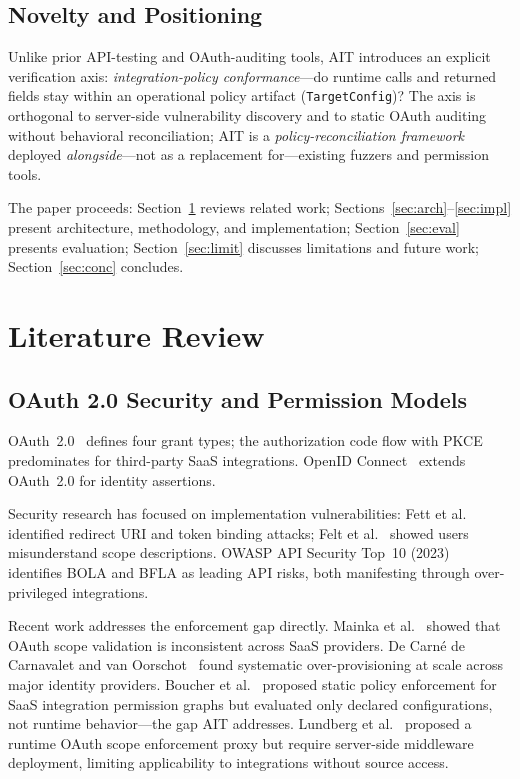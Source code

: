 \documentclass[conference]{IEEEtran}
\begin{document}
\subsection{Novelty and Positioning}

Unlike prior API-testing and OAuth-auditing tools, AIT introduces an
explicit verification axis: \emph{integration-policy conformance}---do
runtime calls and returned fields stay within an operational policy
artifact (\texttt{TargetConfig})? The axis is orthogonal to server-side
vulnerability discovery and to static OAuth auditing without behavioral
reconciliation; AIT is a \emph{policy-reconciliation framework} deployed
\emph{alongside}---not as a replacement for---existing fuzzers and
permission tools.

The paper proceeds: Section~\ref{sec:lit} reviews related work;
Sections~\ref{sec:arch}--\ref{sec:impl} present architecture,
methodology, and implementation; Section~\ref{sec:eval} presents
evaluation; Section~\ref{sec:limit} discusses limitations and future
work; Section~\ref{sec:conc} concludes.

\section{Literature Review}
\label{sec:lit}

\subsection{OAuth 2.0 Security and Permission Models}

OAuth~2.0~\cite{rfc6749} defines four grant types; the authorization
code flow with PKCE~\cite{rfc7636} predominates for third-party SaaS
integrations. OpenID Connect~\cite{oidc} extends OAuth~2.0 for
identity assertions.

Security research has focused on implementation vulnerabilities: Fett
et al.~\cite{fett2017} identified redirect URI and token binding
attacks; Felt et al.~\cite{felt2012} showed users misunderstand scope
descriptions. OWASP API Security Top~10 (2023)~\cite{owasp2023}
identifies BOLA and BFLA as leading API risks, both manifesting
through over-privileged integrations.

Recent work addresses the enforcement gap directly. Mainka et
al.~\cite{mainka2022} showed that OAuth scope validation is
inconsistent across SaaS providers. De Carné de Carnavalet and van
Oorschot~\cite{decarne2023} found systematic over-provisioning at
scale across major identity providers. Boucher et al.~\cite{boucher2024}
proposed static policy enforcement for SaaS integration permission
graphs but evaluated only declared configurations, not runtime
behavior---the gap AIT addresses. Lundberg et al.~\cite{lundberg2024}
proposed a runtime OAuth scope enforcement proxy but require server-side
middleware deployment, limiting applicability to integrations without
source access.
\end{document}
